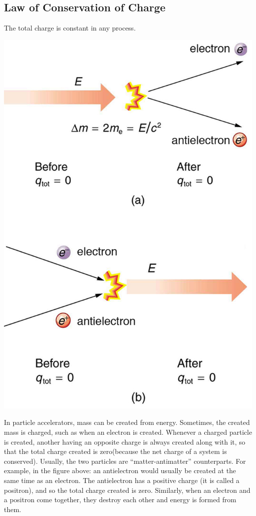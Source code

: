 \documentclass[9pt]{exam}
\begin{document}
	\subsection*{Law of Conservation of Charge}
	The total charge is constant in any process. \begin{center}
		\includegraphics[scale=0.3]{charge_conservation.jpg}
	\end{center}
	In particle accelerators, mass can be created from energy. Sometimes, the created mass is charged, such as when an electron is created. Whenever a charged particle is created, another having an opposite charge is always created along with it, so that the total charge created is zero(because the net charge of a system is conserved). Usually, the two particles are “matter-antimatter” counterparts. For example, in the figure above: an antielectron would usually be created at the same time as an electron. The antielectron has a positive charge (it is called a positron), and so the total charge created is zero. Similarly, when an electron and a positron come together, they destroy each other and energy is formed from them.
\end{document}
